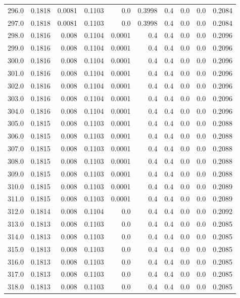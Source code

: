 \begin{longtable}{lrrrrrrrrr}
296.0 & 0.1818 & 0.0081 & 0.1103 & 0.0 & 0.3998 & 0.4 & 0.0 & 0.0 & 0.2084 \\
297.0 & 0.1818 & 0.0081 & 0.1103 & 0.0 & 0.3998 & 0.4 & 0.0 & 0.0 & 0.2084 \\
298.0 & 0.1816 & 0.008 & 0.1104 & 0.0001 & 0.4 & 0.4 & 0.0 & 0.0 & 0.2096 \\
299.0 & 0.1816 & 0.008 & 0.1104 & 0.0001 & 0.4 & 0.4 & 0.0 & 0.0 & 0.2096 \\
300.0 & 0.1816 & 0.008 & 0.1104 & 0.0001 & 0.4 & 0.4 & 0.0 & 0.0 & 0.2096 \\
301.0 & 0.1816 & 0.008 & 0.1104 & 0.0001 & 0.4 & 0.4 & 0.0 & 0.0 & 0.2096 \\
302.0 & 0.1816 & 0.008 & 0.1104 & 0.0001 & 0.4 & 0.4 & 0.0 & 0.0 & 0.2096 \\
303.0 & 0.1816 & 0.008 & 0.1104 & 0.0001 & 0.4 & 0.4 & 0.0 & 0.0 & 0.2096 \\
304.0 & 0.1816 & 0.008 & 0.1104 & 0.0001 & 0.4 & 0.4 & 0.0 & 0.0 & 0.2096 \\
305.0 & 0.1815 & 0.008 & 0.1103 & 0.0001 & 0.4 & 0.4 & 0.0 & 0.0 & 0.2088 \\
306.0 & 0.1815 & 0.008 & 0.1103 & 0.0001 & 0.4 & 0.4 & 0.0 & 0.0 & 0.2088 \\
307.0 & 0.1815 & 0.008 & 0.1103 & 0.0001 & 0.4 & 0.4 & 0.0 & 0.0 & 0.2088 \\
308.0 & 0.1815 & 0.008 & 0.1103 & 0.0001 & 0.4 & 0.4 & 0.0 & 0.0 & 0.2088 \\
309.0 & 0.1815 & 0.008 & 0.1103 & 0.0001 & 0.4 & 0.4 & 0.0 & 0.0 & 0.2088 \\
310.0 & 0.1815 & 0.008 & 0.1103 & 0.0001 & 0.4 & 0.4 & 0.0 & 0.0 & 0.2089 \\
311.0 & 0.1815 & 0.008 & 0.1103 & 0.0001 & 0.4 & 0.4 & 0.0 & 0.0 & 0.2089 \\
312.0 & 0.1814 & 0.008 & 0.1104 & 0.0 & 0.4 & 0.4 & 0.0 & 0.0 & 0.2092 \\
313.0 & 0.1813 & 0.008 & 0.1103 & 0.0 & 0.4 & 0.4 & 0.0 & 0.0 & 0.2085 \\
314.0 & 0.1813 & 0.008 & 0.1103 & 0.0 & 0.4 & 0.4 & 0.0 & 0.0 & 0.2085 \\
315.0 & 0.1813 & 0.008 & 0.1103 & 0.0 & 0.4 & 0.4 & 0.0 & 0.0 & 0.2085 \\
316.0 & 0.1813 & 0.008 & 0.1103 & 0.0 & 0.4 & 0.4 & 0.0 & 0.0 & 0.2085 \\
317.0 & 0.1813 & 0.008 & 0.1103 & 0.0 & 0.4 & 0.4 & 0.0 & 0.0 & 0.2085 \\
318.0 & 0.1813 & 0.008 & 0.1103 & 0.0 & 0.4 & 0.4 & 0.0 & 0.0 & 0.2085 \\

\end{longtable}

